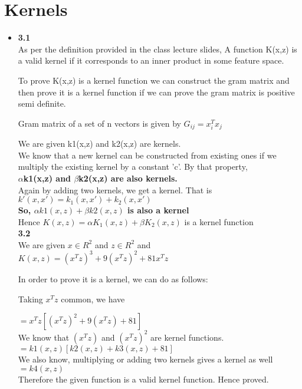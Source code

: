 \documentclass[11pt]{article}
\begin{document}
\section{Kernels}
\begin{itemize}

\item[]

\textbf{3.1}\\

As per the definition provided in the class lecture slides, A function K(x,z) is a valid kernel if it corresponds to an inner product in some feature space.

To prove K(x,z) is a kernel function we can construct the gram matrix and then prove it is a kernel function if we can prove the gram matrix is positive semi definite.

Gram matrix of a set of n vectors is given by $G_{ij}=x_i^Tx_j$

We are given k1(x,z) and k2(x,z) are kernels.\\

We know that a new kernel can be constructed from existing ones if we multiply the existing kernel by a constant 'c'. By that property,\\
\textbf{ $\alpha{}$k1(x,z) and $\beta{}$k2(x,z) are also kernels.}\\

Again by adding two kernels, we get a kernel. That is  \\
$k'(x, x') =k_1(x, x') +k_2(x, x')$ \\
\textbf{So,
$ \alpha{}k1(x,z) + \beta{}k2(x,z) $ is also a kernel }\\

Hence $K(x,z)= \alpha K_1(x,z) + \beta K_2(x,z)$ is a kernel function\\

\textbf{3.2}\\


We are given $x \in R^2$ and $z \in  R^2 $ and \\
$K(x,z)=(x^Tz)^3+9(x^Tz)^2+81x^Tz$

In order to prove it is a kernel, we can do as follows:

Taking $x^Tz$ common, we have 

$=x^Tz[ (x^Tz)^2+9(x^Tz)+81]$\\

We know that $(x^Tz)$ and $(x^Tz)^2$ are kernel functions. \\
$=k1(x,z)[k2(x,z)+k3(x,z)+81]$\\

We also know, multiplying or adding two kernels gives a kernel as well\\
$=k4(x,z)$\\
Therefore the given function is a valid kernel function. Hence proved.

\end{itemize}
\end{document}
